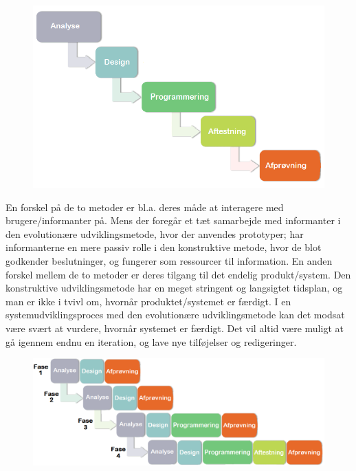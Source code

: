 \begin{figure}[ht]
	\centering
	\includegraphics[scale=0.5]{billeder/konstruktivemetode.png}
  	\label{fig:konstruktivemetode}
\end{figure}

En forskel på de to metoder er bl.a. deres måde at interagere med brugere/informanter på. Mens der foregår et tæt samarbejde med informanter i den evolutionære udviklingsmetode, hvor der anvendes prototyper; har informanterne en mere passiv rolle i den konstruktive metode, hvor de blot godkender beslutninger, og fungerer som ressourcer til information. En anden forskel mellem de to metoder er deres tilgang til det endelig produkt/system. Den konstruktive udviklingsmetode har en meget stringent og langsigtet tidsplan, og man er ikke i tvivl om, hvornår produktet/systemet er færdigt. I en systemudviklingsproces med den evolutionære udviklingsmetode kan det modsat være svært at vurdere,  hvornår systemet er færdigt. Det vil altid være muligt at gå igennem endnu en iteration, og lave nye tilføjelser og redigeringer.

\begin{figure}[ht]
	\centering
	\includegraphics[scale=0.5]{billeder/blandingsmetode.png}
  	\label{fig:blandingsmetode}
\end{figure}

